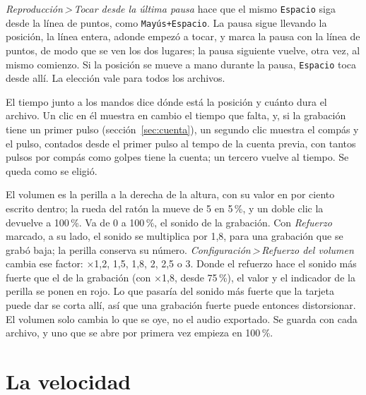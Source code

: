 \documentclass[12pt,
              article,
              oneside
              ]{memoir}
\newcommand*{\menu}[1]{\textit{#1}}
\newcommand*{\then}{\,>\,}
\newcommand*{\key}[1]{\texttt{#1}}
\begin{document}
%
\menu{Reproducción\then Tocar desde la última pausa} hace que el mismo
\key{Espacio} siga desde la línea de puntos, como \key{Mayús+Espacio}. La
pausa sigue llevando la posición, la línea entera, adonde empezó a tocar, y
marca la pausa con la línea de puntos, de modo que se ven los dos lugares;
la pausa siguiente vuelve, otra vez, al mismo comienzo. Si la posición se
mueve a mano durante la pausa, \key{Espacio} toca desde allí. La elección
vale para todos los archivos.

%
El tiempo junto a los mandos dice dónde está la posición y cuánto dura el
archivo. Un clic en él muestra en cambio el tiempo que falta, y, si la
grabación tiene un primer pulso (sección~\ref{sec:cuenta}), un segundo clic
muestra el compás y el pulso, contados desde el primer pulso al tempo de la
cuenta previa, con tantos pulsos por compás como golpes tiene la cuenta; un
tercero vuelve al tiempo. Se queda como se eligió.

%
El volumen es la perilla a la derecha de la altura, con su valor en por
ciento escrito dentro; la rueda del ratón la mueve de 5 en 5\,\%, y un doble
clic la devuelve a 100\,\%. Va de 0 a 100\,\%, el sonido de la grabación.
Con \menu{Refuerzo} marcado, a su lado, el sonido se multiplica por 1,8,
para una grabación que se grabó baja; la perilla conserva su número.
\menu{Configuración\then Refuerzo del volumen} cambia ese factor:
\(\times\)1,2, 1,5, 1,8, 2, 2,5 o 3. Donde el refuerzo hace el sonido más
fuerte que el de la grabación (con \(\times\)1,8, desde 75\,\%), el valor y
el indicador de la perilla se ponen en rojo. Lo que pasaría del sonido más fuerte que la
tarjeta puede dar se corta allí, así que una grabación fuerte puede
entonces distorsionar. El volumen solo cambia lo que se oye, no el audio
exportado. Se guarda con cada archivo, y uno que se abre por primera vez
empieza en 100\,\%.

\section{La velocidad}
\end{document}
